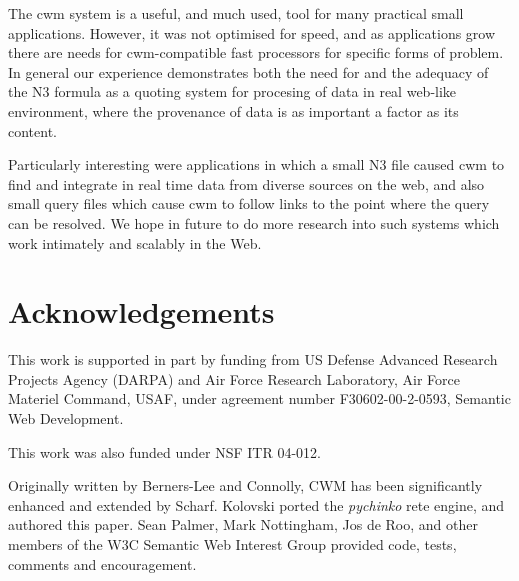 \documentclass{tlp}
\begin{document}
\par The cwm system is a useful, and much used, tool for many
practical small applications. However, it was not optimised for
speed, and as applications grow there are needs for cwm-compatible
fast processors for specific forms of problem. In general our
experience demonstrates both the need for and the adequacy of the
N3 formula as a quoting system for procesing of data in real
web-like environment, where the provenance of data is as important
a factor as its content.

\par Particularly interesting were applications in which a small N3
file caused cwm to find and integrate in real time data from
diverse sources on the web, and also small query files which cause
cwm to follow links to the point where the query can be resolved.
We hope in future to do more research into such systems which work
intimately and scalably in the Web.
\section{Acknowledgements}
  

\par This work is supported in part by funding from US Defense
Advanced Research Projects Agency (DARPA) and Air Force Research
Laboratory, Air Force Materiel Command, USAF, under agreement
number F30602-00-2-0593, \empty Semantic Web
Development.

\par This work was also funded under \empty NSF \empty ITR
04-012.

\par Originally written by Berners-Lee and Connolly, CWM has been
significantly enhanced and extended by Scharf. Kolovski ported the
{\em pychinko} rete engine, and authored this paper. Sean
Palmer, Mark Nottingham, Jos de Roo, and other members of the W3C
Semantic Web Interest Group provided code, tests, comments and
encouragement.


\end{document}
